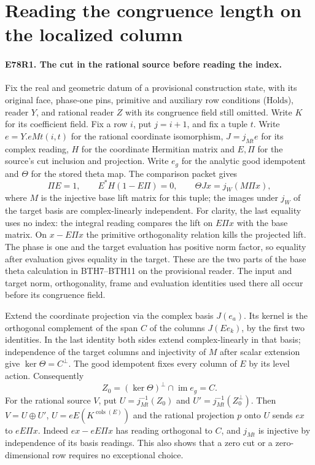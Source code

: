 \section{Reading the congruence length on the localized column}

\paragraph{E78R1. The cut in the rational source before reading the index.}
Fix the real and geometric datum of a provisional construction state,
with its original face, phase-one pins, primitive and auxiliary row
conditions ($\mathrm{Holds}$), reader $Y$, and rational reader $Z$
with its congruence field still omitted. Write $K$ for its coefficient
field. Fix a row $i$, put $j=i+1$, and fix a tuple $t$. Write
$e=Y.eMt(i,t)$ for the rational coordinate isomorphism,
$J=j_{Mt}e$ for its complex reading, $H$ for the coordinate
Hermitian matrix and $E,\Pi$ for the source's cut inclusion and
projection. Write $e_g$ for the analytic good idempotent and
$\Theta$ for the stored theta map. The comparison packet gives
\[
 \Pi E=1,\qquad E^*H(1-E\Pi)=0,\qquad
 \Theta Jx=j_W(M\Pi x),
\]
where $M$ is the injective base lift matrix for this tuple; the images
under $j_W$ of the target basis are complex-linearly independent.
For clarity, the last equality uses no index: the integral reading
compares the lift on $E\Pi x$ with the base matrix. On
$x-E\Pi x$ the primitive orthogonality relation kills the projected
lift. The phase is one and the target evaluation has positive norm
factor, so equality after evaluation gives equality in the target.
These are the two parts of the base theta calculation in BTH7--BTH11
on the provisional reader. The input and target norm, orthogonality,
frame and evaluation identities used there all occur before its
congruence field.

Extend the coordinate projection via the complex basis $J(e_a)$.
Its kernel is the orthogonal complement of the span $C$ of the
columns $J(Ee_k)$, by the first two identities. In the last identity
both sides extend complex-linearly in that basis; independence of
the target columns and injectivity of $M$ after scalar extension
give $\ker\Theta=C^\perp$. The good idempotent fixes every column
of $E$ by its level action. Consequently
\[
 Z_0=(\ker\Theta)^\perp\cap\operatorname{im}e_g=C .
\]
For the rational source $V$, put $U=j_{Mt}^{-1}(Z_0)$ and
$U'=j_{Mt}^{-1}(Z_0^\perp)$. Then $V=U\oplus U'$,
$U=eE(K^{\operatorname{cols}(E)})$ and the rational projection
$p$ onto $U$ sends $ex$ to $eE\Pi x$. Indeed $ex-eE\Pi x$
has reading orthogonal to $C$, and $j_{Mt}$ is injective by
independence of its basis readings. This also shows that a zero cut
or a zero-dimensional row requires no exceptional choice.

